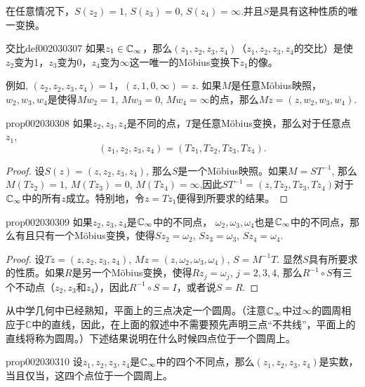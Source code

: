在任意情况下，$S(z_2) = 1$, $S(z_3) = 0$, $S(z_4) = \infty$.并且$S$是具有这种性质的唯一变换。
\begin{definition}{交比}{def002030307}
如果$z_1 \in \mathbb{C}_{\infty}$，那么$(z_1,z_2,z_3,z_4)$（$z_1,z_2,z_3,z_4$的交比）是使$z_2$变为1，$z_3$变为0，$z_4$变为$\infty$这一唯一的M\"obius变换下$z_1$的像。
\end{definition}

例如, $(z_2,z_2, z_3, z_4)=1$，$(z, 1, 0, \infty)=z$. 如果$M$是任意M\"obius映照，$w_2,w_3,w_4$是使得$Mw_2=1$, $Mw_3=0$, $Mw_4=\infty$的点，那么$Mz=(z,w_2,w_3,w_4)$.

\begin{proposition}{}{prop002030308}
如果$z_2,z_3,z_4$是不同的点，$T$是任意M\"obius变换，那么对于任意点$z_1$,
\[
(z_1,z_2,z_3,z_4) = (Tz_1, Tz_2, Tz_3, Tz_4).
\]
\end{proposition}

\begin{proof}
设$S(z) = (z, z_2, z_3, z_4)$, 那么$S$是一个M\"obius映照。如果$M = ST^{-1}$, 那么$M(Tz_2) = 1$, $M(Tz_3) = 0$, $M(Tz_4) = \infty$,因此$ST^{-1} = (z, Tz_2, Tz_3, Tz_4)$对于$\mathbb{C}_{\infty}$中的所有$z$成立。特别地，令$z = Tz_1$便得到所要求的结果。
\end{proof}

\begin{proposition}{}{prop002030309}
如果$z_2, z_3, z_4$是$\mathbb{C}_{\infty}$中的不同点， $\omega_2, \omega_3, \omega_4$也是$\mathbb{C}_{\infty}$中的不同点，那么有且只有一个M\"obius变换，使得$Sz_2=\omega_2$, $Sz_3 = \omega_3$, $Sz_4 = \omega_4$.
\end{proposition}

\begin{proof}
设$Tz = (z, z_2, z_3, z_4)$, $Mz = (z, \omega_2, \omega_3, \omega_4)$, $S = M^{-1}T$. 显然$S$具有所要求的性质。如果$R$是另一个M\"obius变换，使得$Rz_j=\omega_j$, $j=2,3,4$, 那么$R^{-1}\circ S$有三个不动点（$z_2, z_3$和$z_4$），因此$R^{-1} \circ S = I$，或者说$S = R$.
\end{proof}

从中学几何中已经熟知，平面上的三点决定一个圆周。（注意$\mathbb{C}_{\infty}$中过$\infty$的圆周相应于$\mathbb{C}$中的直线，因此，在上面的叙述中不需要预先声明三点“不共线”，平面上的直线将称为圆周。）下述结果说明在什么时候四点位于一个圆周上。

\begin{proposition}{}{prop002030310}
设$z_1,z_2,z_3,z_4$是$\mathbb{C}_{\infty}$中的四个不同点，那么$(z_1,z_2,z_3,z_4)$是实数，当且仅当，这四个点位于一个圆周上。
\end{proposition}

